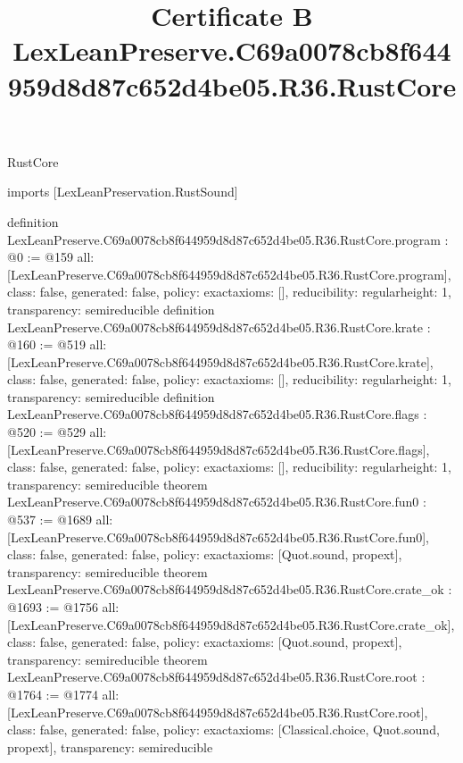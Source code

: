 \begin{lexlean}{RustCore}
\title{Certificate B LexLeanPreserve.C69a0078cb8f644959d8d87c652d4be05.R36.RustCore}
\begin{coremodule}
imports [LexLeanPreservation.RustSound]

definition LexLeanPreserve.C69a0078cb8f644959d8d87c652d4be05.R36.RustCore.program : @0 := @159 {
  all: [LexLeanPreserve.C69a0078cb8f644959d8d87c652d4be05.R36.RustCore.program],
  class: false,
  generated: false,
  policy: exact{axioms: []},
  reducibility: regular{height: 1},
  transparency: semireducible
}
definition LexLeanPreserve.C69a0078cb8f644959d8d87c652d4be05.R36.RustCore.krate : @160 := @519 {
  all: [LexLeanPreserve.C69a0078cb8f644959d8d87c652d4be05.R36.RustCore.krate],
  class: false,
  generated: false,
  policy: exact{axioms: []},
  reducibility: regular{height: 1},
  transparency: semireducible
}
definition LexLeanPreserve.C69a0078cb8f644959d8d87c652d4be05.R36.RustCore.flags : @520 := @529 {
  all: [LexLeanPreserve.C69a0078cb8f644959d8d87c652d4be05.R36.RustCore.flags],
  class: false,
  generated: false,
  policy: exact{axioms: []},
  reducibility: regular{height: 1},
  transparency: semireducible
}
theorem LexLeanPreserve.C69a0078cb8f644959d8d87c652d4be05.R36.RustCore.fun0 : @537 := @1689 {
  all: [LexLeanPreserve.C69a0078cb8f644959d8d87c652d4be05.R36.RustCore.fun0],
  class: false,
  generated: false,
  policy: exact{axioms: [Quot.sound, propext]},
  transparency: semireducible
}
theorem LexLeanPreserve.C69a0078cb8f644959d8d87c652d4be05.R36.RustCore.crate_ok : @1693 := @1756 {
  all: [LexLeanPreserve.C69a0078cb8f644959d8d87c652d4be05.R36.RustCore.crate_ok],
  class: false,
  generated: false,
  policy: exact{axioms: [Quot.sound, propext]},
  transparency: semireducible
}
theorem LexLeanPreserve.C69a0078cb8f644959d8d87c652d4be05.R36.RustCore.root : @1764 := @1774 {
  all: [LexLeanPreserve.C69a0078cb8f644959d8d87c652d4be05.R36.RustCore.root],
  class: false,
  generated: false,
  policy: exact{axioms: [Classical.choice, Quot.sound, propext]},
  transparency: semireducible
}


\end{coremodule}
\end{lexlean}

